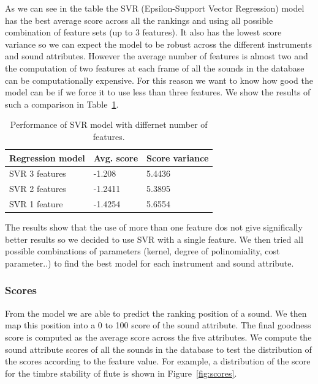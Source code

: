 \documentclass{article}
\begin{document}
As we can see in the table the SVR (Epsilon-Support Vector Regression) model has the best average score across all the rankings and using all possible combination of feature sets (up to 3 features). It also has the lowest score variance so we can expect the model to be robust across the different instruments and sound attributes. However the average number of features is almost two and the computation of two features at each frame of all the sounds in the database can be computationally expensive. For this reason we want to know how good the model can be if we force it to use less than three features. We show the results of such a comparison in Table~\ref{svr}.

\begin{table}[]
\centering
\label{my-label}
\begin{tabular}{lll}
\hline
Regression model & Avg. score & Score variance \\ \hline
SVR 3 features   & -1.208     & 5.4436         \\
SVR 2 features   & -1.2411    & 5.3895         \\
SVR 1 feature    & -1.4254    & 5.6554         \\ \hline
\end{tabular}
\caption{Performance of SVR model with differnet number of features.}
\label{svr}
\end{table}

The results show that the use of more than one feature dos not give significally better results so we decided to use SVR with a single feature. We then tried all possible combinations of parameters (kernel, degree of polinomiality, cost parameter..) to find the best model for each instrument and sound attribute.

\subsubsection{Scores}
From the model we are able to predict the ranking position of a sound. We then map this position into a 0 to 100 score of the sound attribute. The final goodness score is computed as the average score across the five attributes. We compute the sound attribute scores of all the sounds in the database to test the distribution of the scores according to the feature value. For example, a distribution of the score for the timbre stability of flute is shown in Figure~\ref{fig:scores}.
\end{document}
